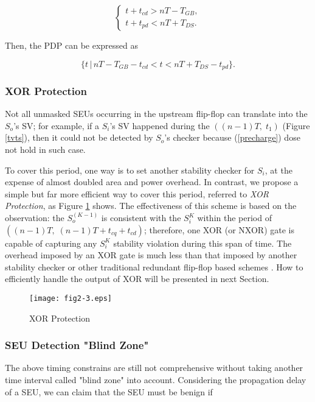 \[
\left\{
\begin{array}{ll}
 t+t_{cd} > nT-T_{GB}, \\
 t+t_{pd} < nT+T_{DS}.
 \end{array} \right.
\]

Then, the PDP can be expressed as

\begin{equation} \label{eq2}
\{t\,|\, nT-T_{GB}-t_{cd} < t <nT+T_{DS}-t_{pd}\}.
\end{equation}

\subsubsection{XOR Protection}

Not all unmasked SEUs occurring in the upstream flip-flop can translate into the $S_o$'s SV; for example, if a  $S_i$'s SV happened during the $((n-1)T,\; t_1)$ (Figure \ref{tvts}), then it could not be detected by $S_o$'s checker  because (\ref{precharge}) dose not hold in such case.

To cover this period, one way is to set another stability checker for $S_i$, at the expense of almost doubled area and power overhead. In contrast, we propose a simple but far more efficient way to cover this period, referred to \emph{XOR Protection}, as Figure \ref{xor} shows. The effectiveness of this scheme is based on the observation: the $S_o^{(K-1)}$ is consistent with the $S_i^K$ within the period of $((n-1)T,\; (n-1)T+t_{cq}+t_{cd})$; therefore, one XOR (or NXOR) gate is capable of capturing any $S_i^K$ stability violation during this span of time. The overhead imposed by an XOR gate is much less than that imposed by another stability checker or other traditional redundant flip-flop based schemes \cite{Mitra_C05}. How to efficiently handle the output of XOR will be presented in next Section.

\begin{figure}[t]
\centering
\texttt{[image: fig2-3.eps]}
\vspace{-0.5em}  
\caption{XOR Protection}\label{xor}
\end{figure}

\subsubsection{SEU Detection "Blind Zone"}

The above timing constrains are still not comprehensive without taking another time interval called "blind zone" into account.  Considering the propagation delay of a SEU, we can claim that the SEU must be benign if

